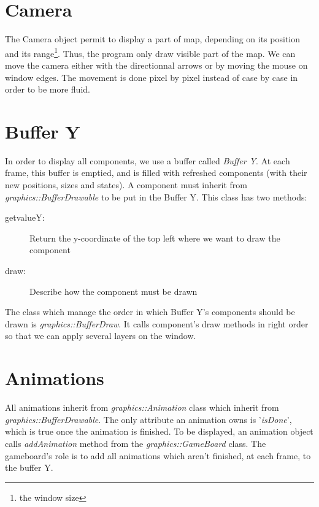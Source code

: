 \documentclass{scrreprt}
\begin{document}
		\section{Camera}
		The Camera object permit to display a part of map, depending on its position and its range\footnote{the window size}. Thus, the program only draw visible part of the map. We can move the camera either with the directionnal arrows or by moving the mouse on window edges. The movement is done pixel by pixel instead of case by case in order to be more fluid.

		\section{Buffer Y}
		In order to display all components, we use a buffer called \emph{Buffer Y}. At each frame, this buffer is emptied, and is filled with refreshed components (with their new positions, sizes and states). A component must inherit from \emph{graphics::BufferDrawable} to be put in the Buffer Y. This class has two methods:
			\begin{description}
			\item[getvalueY:]{Return the y-coordinate of the top left where we want to draw the component}
			\item[draw:]{Describe how the component must be drawn}
			\end{description}

			The class which manage the order in which Buffer Y's components should be drawn is \emph{graphics::BufferDraw}. It calls component's draw methods in right order so that we can apply several layers on the window.

			\section{Animations}
			All animations inherit from \emph{graphics::Animation} class which inherit from \emph{graphics::BufferDrawable}. The only attribute an animation owns is '\emph{isDone}', which is true once the animation is finished. To be displayed, an animation object calls \emph{addAnimation} method from the \emph{graphics::GameBoard} class. The gameboard's role is to add all animations which aren't finished, at each frame, to the buffer Y.\\
\end{document}
